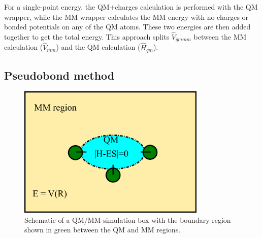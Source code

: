 \documentclass[12pt]{report}
\begin{document}
For a single-point energy, the QM+charges calculation is performed with the QM
wrapper, while the MM wrapper calculates the MM energy with no charges or
bonded potentials on any of the QM atoms.
These two energies are then added together to get the total energy.
This approach splits $\hat V_{qmmm}$ between the MM calculation
($\hat V_{mm}$) and the QM calculation ($\hat H_{qm}$).

\subsection{Pseudobond method}

\begin{figure}[hbt]
 \centering
 \includegraphics[width=0.8\textwidth]{../doc/images/QMMM_2.png}
 \caption{
 Schematic of a QM/MM simulation box with the boundary region shown in
 green between the QM and MM regions.}
 \label{fig:QMMM2}
\end{figure}
\end{document}
